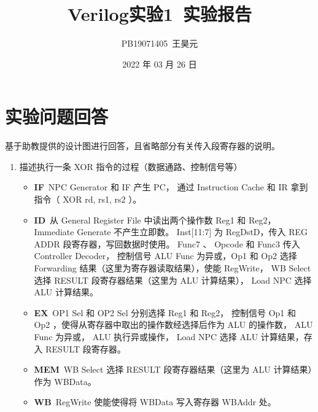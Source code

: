 \documentclass[UTF8]{article}
\title{Verilog实验1\ 实验报告}
\author{PB19071405\ 王昊元}
\date{2022 年 03 月 26 日}
\begin{document}
\pagestyle{empty}
\maketitle
\thispagestyle{empty}  %

\section*{实验问题回答}

\noindent
基于助教提供的设计图进行回答，且省略部分有关传入段寄存器的说明。

\begin{enumerate}
    \item 描述执行一条 XOR 指令的过程（数据通路、控制信号等）
    
    \begin{itemize}
        \item \textbf{IF}\ NPC Generator 和 IF 产生 PC，
        通过 Instruction Cache 和 IR 拿到指令（ XOR rd, rs1, rs2 ）。
    
        \item \textbf{ID}\ 从 General Register File 中读出两个操作数 Reg1 和 Reg2，
        Immediate Generate 不产生立即数。
        Inst[11:7] 为 RegDstD，传入 REG ADDR 段寄存器，写回数据时使用。
        Func7 、 Opcode 和 Func3 传入 Controller Decoder，
        控制信号 ALU Func 为异或，Op1 和 Op2 选择 Forwarding 结果（这里为寄存器读取结果），使能 RegWrite，
        WB Select 选择 RESULT 段寄存器结果（这里为 ALU 计算结果）， Load NPC 选择 ALU 计算结果。
    
        \item \textbf{EX}\ OP1 Sel 和 OP2 Sel 分别选择 Reg1 和 Reg2，
        控制信号 Op1 和 Op2 ，使得从寄存器中取出的操作数经选择后作为 ALU 的操作数，
        ALU Func 为异或， ALU 执行异或操作， Load NPC 选择 ALU 计算结果，存入 RESULT 段寄存器。
    
        \item \textbf{MEM}\ WB Select 选择 RESULT 段寄存器结果（这里为 ALU 计算结果）作为 WBData。
    
        \item \textbf{WB}\ RegWrite 使能使得将 WBData 写入寄存器 WBAddr 处。
    \end{itemize}


\end{enumerate}
\end{document}
